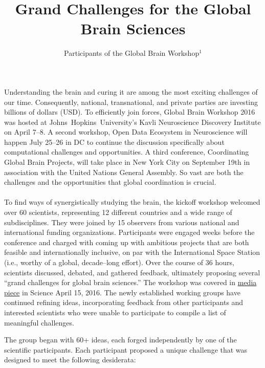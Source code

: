 \documentclass{amsart}
\begin{document}
\author{Participants of the Global Brain Workshop$^1$}
\title{Grand Challenges for the Global Brain Sciences}
\date{}
\maketitle

Understanding the brain and curing it are among the most
exciting challenges of our time. Consequently, national,
transnational, and private parties are investing billions
of dollars (USD). To efficiently join forces, Global 
Brain Workshop 2016 was hosted at 
Johns~Hopkins~University's Kavli Neuroscience Discovery
Institute on April 7--8. A second workshop, Open 
Data Ecosystem in Neuroscience will happen July 25--26 
in DC to continue the discussion specifically about 
computational challenges and opportunities. A third conference, Coordinating Global Brain Projects, will take
place in New York City on September 19th in association
with the United Nations General Assembly. So vast are
both the challenges and the opportunities that global
coordination is crucial. \\ \\ 

To find ways of synergistically studying the brain, the kick­off
workshop welcomed over 60 scientists, representing 12 different
countries and a wide range of subdisciplines. They were joined by 15
observers from various national and international funding
organizations. Participants were engaged weeks before the conference
and charged with coming up with ambitious projects that are both
feasible and internationally inclusive, on par with the
International Space Station (i.e., worthy of a global, decade--long
effort).  Over the course of 36 hours, scientists discussed, debated, and
gathered feedback, ultimately proposing several ``grand challenges
for global brain sciences.'' The workshop was covered in 
\href{http://science.sciencemag.org/content/352/6283/277}{media piece}
in Science April 15, 2016. The newly established working groups have
continued refining ideas, incorporating feedback from other participants
and interested scientists who were unable to participate to compile a
list of meaningful challenges.


The group began with 60+ ideas, each forged independently by one of the
scientific participants. Each participant proposed a unique challenge 
that was designed to meet the following desiderata: \\
\end{document}
